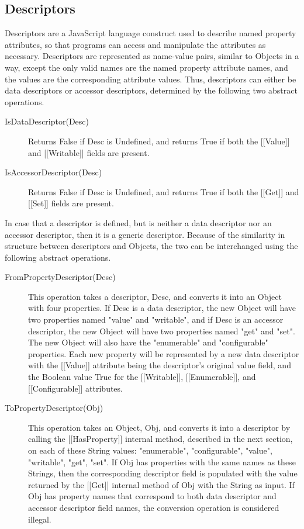 \documentclass[a4paper,11pt,twoside]{report}
\begin{document}
\subsection{Descriptors}\label{sec:descriptors}
Descriptors are a JavaScript language construct used to describe named property attributes, so that programs can access and manipulate the attributes as necessary. Descriptors are represented as name-value pairs, similar to Objects in a way, except the only valid names are the named property attribute names, and the values are the corresponding attribute values. Thus, descriptors can either be data descriptors or accessor descriptors, determined by the following two abstract operations.

\begin{description}
\item[IsDataDescriptor(Desc)] Returns False if Desc is Undefined, and returns True if both the [[Value]] and [[Writable]] fields are present.

\item[IsAccessorDescriptor(Desc)] Returns False if Desc is Undefined, and returns True if both the [[Get]] and [[Set]] fields are present.
\end{description}

In case that a descriptor is defined, but is neither a data descriptor nor an accessor descriptor, then it is a generic descriptor. Because of the similarity in structure between descriptors and Objects, the two can be interchanged using the following abstract operations.

\begin{description}
\item[FromPropertyDescriptor(Desc)] This operation takes a descriptor, Desc, and converts it into an Object with four properties. If Desc is a data descriptor, the new Object will have two properties named "value" and "writable", and if Desc is an accessor descriptor, the new Object will have two properties named "get" and "set". The new Object will also have the "enumerable" and "configurable" properties. Each new property will be represented by a new data descriptor with the [[Value]] attribute being the descriptor's original value field, and the Boolean value True for the [[Writable]], [[Enumerable]], and [[Configurable]] attributes.

\item[ToPropertyDescriptor(Obj)] This operation takes an Object, Obj, and converts it into a descriptor by calling the [[HasProperty]] internal method, described in the next section, on each of these String values: "enumerable", "configurable", "value", "writable", "get", "set". If Obj has properties with the same names as these Strings, then the corresponding descriptor field is populated with the value returned by the [[Get]] internal method of Obj with the String as input. If Obj has property names that correspond to both data descriptor and accessor descriptor field names, the conversion operation is considered illegal.
\end{description}
\end{document}
